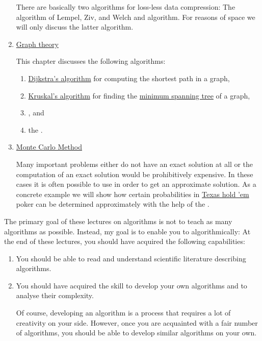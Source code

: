 \begin{enumerate}
      There are basically two algorithms for loss-less data compression: The algorithm of Lempel, Ziv, and
      Welch and  algorithm.  For reasons of space we will only discuss the latter algorithm.
\item \href{http://en.wikipedia.org/wiki/Graph_theory}{Graph theory}
  
      This chapter discusses the following algorithms:
      \begin{enumerate}
      \item \href{http://en.wikipedia.org/wiki/Dijkstra%27s_algorithm}{Dijkstra's algorithm}
            for computing the shortest path in a graph,
      \item \href{https://en.wikipedia.org/wiki/Kruskal%27s_algorithm}{Kruskal's algorithm} for finding the
            \href{https://en.wikipedia.org/wiki/Minimum_spanning_tree}{minimum spanning tree} of a graph,
      \item {}, and 
      \item the .
      \end{enumerate}
\item \href{http://en.wikipedia.org/wiki/Monte_Carlo_method}{Monte Carlo Method} 
 
      Many important problems either do not have an exact solution at all or the computation of an
      exact solution would be prohibitively expensive.  In these cases it is often possible to use 
       in order to get an approximate solution.  As a concrete example we will show
      how certain probabilities in \href{http://en.wikipedia.org/wiki/Texas_hold_%27em}{Texas hold 'em} 
      poker can be determined approximately with the help of the .
\end{enumerate}
The primary goal of these lectures on algorithms is not to teach as many algorithms as possible.
Instead, my goal is to enable you to  algorithmically:  At the end of these
lectures, you should have acquired the following capabilities:
\pagebreak
\begin{enumerate}
\item You should be able to read and understand scientific literature describing algorithms.
\item You should have acquired the skill to develop your own algorithms and to analyse their complexity.

      Of course, developing an algorithm is a process that requires a lot of creativity on your side.  However,
      once you are acquainted with a fair number of algorithms, you should be able to develop similar
      algorithms on your own. 
\end{enumerate}


